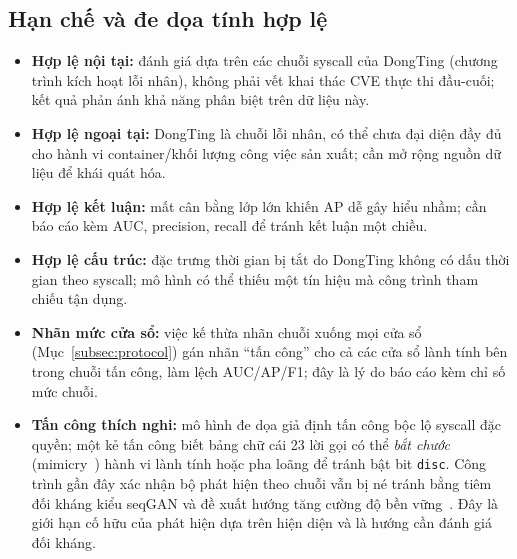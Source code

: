 \subsection{Hạn chế và đe dọa tính hợp lệ}
\begin{itemize}[leftmargin=1.6em]
  \item \textbf{Hợp lệ nội tại:} đánh giá dựa trên các chuỗi syscall của DongTing
        (chương trình kích hoạt lỗi nhân), không phải vết khai thác CVE thực thi
        đầu-cuối; kết quả phản ánh khả năng phân biệt trên dữ liệu này.
  \item \textbf{Hợp lệ ngoại tại:} DongTing là chuỗi lỗi nhân, có thể chưa đại diện
        đầy đủ cho hành vi container/khối lượng công việc sản xuất; cần mở rộng nguồn
        dữ liệu để khái quát hóa.
  \item \textbf{Hợp lệ kết luận:} mất cân bằng lớp lớn khiến AP dễ gây hiểu nhầm; cần
        báo cáo kèm AUC, precision, recall để tránh kết luận một chiều.
  \item \textbf{Hợp lệ cấu trúc:} đặc trưng thời gian bị tắt do DongTing không có dấu
        thời gian theo syscall; mô hình có thể thiếu một tín hiệu mà công trình tham
        chiếu tận dụng.
  \item \textbf{Nhãn mức cửa sổ:} việc kế thừa nhãn chuỗi xuống mọi cửa sổ
        (Mục~\ref{subsec:protocol}) gán nhãn ``tấn công'' cho cả các cửa sổ lành tính
        bên trong chuỗi tấn công, làm lệch AUC/AP/F1; đây là lý do báo cáo kèm chỉ số
        mức chuỗi.
  \item \textbf{Tấn công thích nghi:} mô hình đe dọa giả định tấn công bộc lộ syscall
        đặc quyền; một kẻ tấn công biết bảng chữ cái 23 lời gọi có thể \emph{bắt
        chước} (mimicry~\cite{wagner2002mimicry}) hành vi lành tính hoặc pha loãng để
        tránh bật bit \texttt{disc}. Công trình gần đây xác nhận bộ phát hiện theo
        chuỗi vẫn bị né tránh bằng tiêm đối kháng kiểu seqGAN và đề xuất hướng tăng
        cường độ bền vững~\cite{advrobustseq2025}. Đây là giới hạn cố hữu của phát
        hiện dựa trên hiện diện và là hướng cần đánh giá đối kháng.
\end{itemize}
